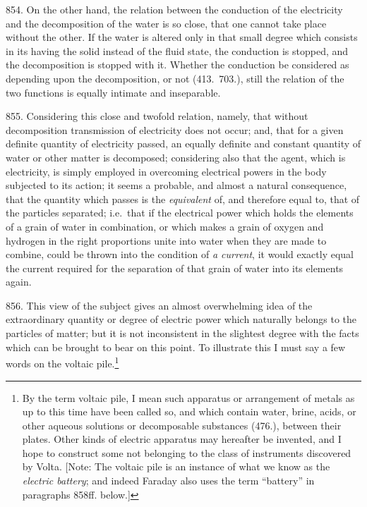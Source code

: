 854. On the other hand, the relation between the conduction of the
electricity and the de\-com\-po\-si\-tion of the water is so close, that one
cannot take place without the other. If the water is altered only in
that small degree which consists in its having the solid instead of the
fluid state, the conduction is stopped, and the de\-com\-po\-si\-tion is stopped
with it. Whether the conduction be considered as depending upon the
de\-com\-po\-si\-tion, or not (413.\ 703.), still the relation of the two
functions is equally intimate and inseparable.

855. Considering this close and twofold relation, namely, that without
de\-com\-po\-si\-tion transmission of electricity does not occur; and, that for
a given definite quantity of electricity passed, an equally definite and
constant quantity of water or other matter is de\-com\-posed; considering
also that the agent, which is electricity, is simply employed in
overcoming electrical powers in the body subjected to its action; it
seems a probable, and almost a natural consequence, that the quantity
which passes is the \emph{equivalent} of, and therefore equal to, that
of the particles separated; i.e.\ that if the electrical power which
holds the elements of a grain of water in combination, or which makes a
grain of oxygen and hydrogen in the right pro\-por\-tions unite into water
when they are made to combine, could be thrown into the condition of
\emph{a current}, it would exactly equal the current required for the
separation of that grain of water into its elements again.

856. This view of the subject gives an almost overwhelming idea of the
extraordinary quantity or degree of electric power which naturally
belongs to the particles of matter; but it is not inconsistent in the
slightest degree with the facts which can be brought to bear on this
point. To illustrate this I must say a few words on the voltaic
pile.\footnote{By the term voltaic pile, I mean such ap\-pa\-ra\-tus or
  arrangement of metals as up to this time have been called so, and
  which contain water, brine, acids, or other aqueous solutions or
  decomposable substances (476.), between their plates. Other kinds of
  electric ap\-pa\-ra\-tus may hereafter be invented, and I hope to construct
  some not belonging to the class of instruments discovered by Volta.
  {[}Note: The voltaic pile is an instance of what we know as the
  \emph{electric battery}; and indeed Faraday also uses the term
  ``battery'' in paragraphs 858ff. below.{]}}

